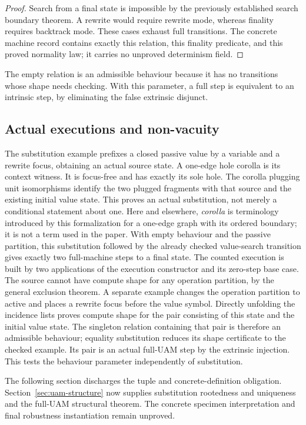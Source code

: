 \begin{proof}
Search from a final state is impossible by the previously established search
boundary theorem. A rewrite would require rewrite mode, whereas finality
requires backtrack mode. These cases exhaust full transitions. The concrete
machine record contains exactly this relation, this finality predicate, and
this proved normality law; it carries no unproved determinism field.
\end{proof}
The empty relation is an admissible behaviour because it has no transitions
whose shape needs checking. With this parameter, a full step is equivalent to
an intrinsic step, by eliminating the false extrinsic disjunct.

\subsection{Actual executions and non-vacuity}
The substitution example prefixes a closed passive value by a variable and a
rewrite focus, obtaining an actual source state. A one-edge hole corolla is
its context witness. It is focus-free and has exactly its sole hole. The
corolla plugging unit isomorphisms identify the two plugged fragments with
that source and the existing initial value state. This proves an actual
substitution, not merely a conditional statement about one.
Here and elsewhere, \emph{corolla} is terminology introduced by this
formalization for a one-edge graph with its ordered boundary; it is not a term
used in the paper.
With empty behaviour and the passive partition, this substitution followed by
the already checked value-search transition gives exactly two full-machine
steps to a final state. The counted execution is built by two applications of
the execution constructor and its zero-step base case. The source cannot have
compute shape for any operation partition, by the general exclusion theorem.
A separate example changes the operation partition to active and places a
rewrite focus before the value symbol. Directly unfolding the incidence lists
proves compute shape for the pair consisting of this state and the initial
value state. The singleton relation containing that pair is therefore an
admissible behaviour; equality substitution reduces its shape certificate to
the checked example. Its pair is an actual full-UAM step by the extrinsic
injection. This tests the behaviour parameter independently of substitution.

The following section discharges the tuple and concrete-definition obligation.
Section~\ref{sec:uam-structure} now supplies substitution rootedness and
uniqueness and the full-UAM structural theorem. The concrete specimen
interpretation and final robustness instantiation remain unproved.
